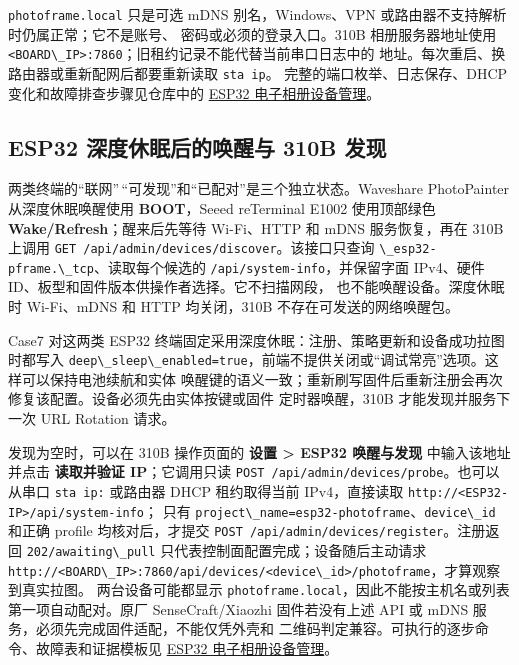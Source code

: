\passthrough{\lstinline!photoframe.local!} 只是可选 mDNS
别名，Windows、VPN 或路由器不支持解析时仍属正常；它不是账号、
密码或必须的登录入口。310B 相册服务器地址使用
\passthrough{\lstinline!<BOARD\_IP>:7860!}；旧租约记录不能代替当前串口日志中的
地址。每次重启、换路由器或重新配网后都要重新读取
\passthrough{\lstinline!sta ip!}。 完整的端口枚举、日志保存、DHCP
变化和故障排查步骤见仓库中的
\href{https://github.com/zhouxzh/Ascend310/blob/main/samples/case7/docs/04-esp32-device-management.md}{ESP32
电子相册设备管理}。

\subsection{ESP32 深度休眠后的唤醒与 310B
发现}\label{esp32-ux6df1ux5ea6ux4f11ux7720ux540eux7684ux5524ux9192ux4e0e-310b-ux53d1ux73b0}

两类终端的``联网''\,``可发现''和``已配对''是三个独立状态。Waveshare
PhotoPainter 从深度休眠唤醒使用 \textbf{BOOT}，Seeed reTerminal E1002
使用顶部绿色 \textbf{Wake/Refresh}；醒来后先等待 Wi-Fi、HTTP 和 mDNS
服务恢复，再在 310B 上调用
\passthrough{\lstinline!GET /api/admin/devices/discover!}。该接口只查询
\passthrough{\lstinline!\_esp32-pframe.\_tcp!}、读取每个候选的
\passthrough{\lstinline!/api/system-info!}，并保留字面 IPv4、硬件
ID、板型和固件版本供操作者选择。它不扫描网段，
也不能唤醒设备。深度休眠时 Wi-Fi、mDNS 和 HTTP 均关闭，310B
不存在可发送的网络唤醒包。

Case7 对这两类 ESP32
终端固定采用深度休眠：注册、策略更新和设备成功拉图时都写入
\passthrough{\lstinline!deep\_sleep\_enabled=true!}，前端不提供关闭或``调试常亮''选项。这样可以保持电池续航和实体
唤醒键的语义一致；重新刷写固件后重新注册会再次修复该配置。设备必须先由实体按键或固件
定时器唤醒，310B 才能发现并服务下一次 URL Rotation 请求。

发现为空时，可以在 310B 操作页面的 \textbf{设置 \textgreater{} ESP32
唤醒与发现} 中输入该地址并点击 \textbf{读取并验证 IP}；它调用只读
\passthrough{\lstinline!POST /api/admin/devices/probe!}。也可以从串口
\passthrough{\lstinline!sta ip:!} 或路由器 DHCP 租约取得当前
IPv4，直接读取
\passthrough{\lstinline!http://<ESP32-IP>/api/system-info!}； 只有
\passthrough{\lstinline!project\_name=esp32-photoframe!}、\passthrough{\lstinline!device\_id!}
和正确 profile 均核对后，才提交
\passthrough{\lstinline!POST /api/admin/devices/register!}。注册返回
\passthrough{\lstinline!202/awaiting\_pull!}
只代表控制面配置完成；设备随后主动请求
\passthrough{\lstinline!http://<BOARD\_IP>:7860/api/devices/<device\_id>/photoframe!}，才算观察到真实拉图。
两台设备可能都显示
\passthrough{\lstinline!photoframe.local!}，因此不能按主机名或列表第一项自动配对。原厂
SenseCraft/Xiaozhi 固件若没有上述 API 或 mDNS
服务，必须先完成固件适配，不能仅凭外壳和
二维码判定兼容。可执行的逐步命令、故障表和证据模板见
\href{https://github.com/zhouxzh/Ascend310/blob/main/samples/case7/docs/04-esp32-device-management.md}{ESP32
电子相册设备管理}。

